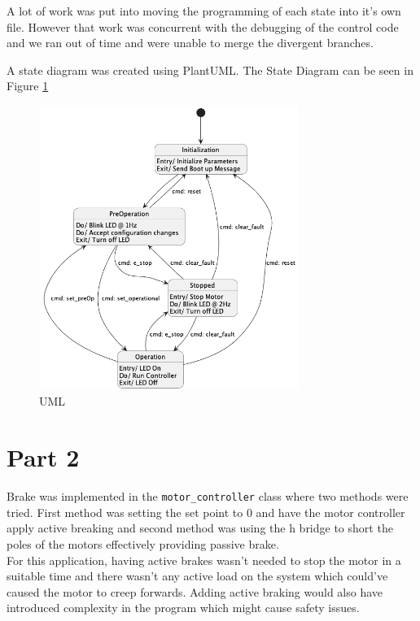 \documentclass{article}
\begin{document}
A lot of work was put into moving the programming of each state into it's own file. However that work was concurrent with the debugging of the control code and we ran out of time and were unable to merge the divergent branches.

A state diagram was created using PlantUML. The State Diagram can be seen in Figure \ref{fig:UML}

\begin{figure}[H]
    \centering
    \includegraphics[width=0.75\textwidth]{Project3ControllerStateMachine/out/Project3ControllerStateMachine/docs/uml/uml.png}
    \caption{UML}
    \label{fig:UML}
\end{figure}

\section{Part 2}


Brake was implemented in the \verb!motor_controller! class where two methods were tried. First method was setting the set point to 0 and have the motor controller apply active breaking and second method was using the h bridge to short the poles of the motors effectively providing passive brake. 
\\
For this application, having active brakes wasn't needed to stop the motor in a suitable time and there wasn't any active load on the system which could've caused the motor to creep forwards. Adding active braking would also have introduced complexity in the program which might cause safety issues.
\end{document}

